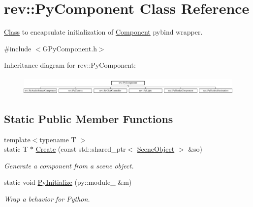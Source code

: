 \hypertarget{classrev_1_1_py_component}{}\section{rev\+::Py\+Component Class Reference}
\label{classrev_1_1_py_component}


\mbox{\hyperlink{struct_class}{Class}} to encapsulate initialization of \mbox{\hyperlink{classrev_1_1_component}{Component}} pybind wrapper.  




{\ttfamily \#include $<$G\+Py\+Component.\+h$>$}

Inheritance diagram for rev\+::Py\+Component\+:\begin{figure}[H]
\begin{center}
\leavevmode
\includegraphics[height=0.947547cm]{classrev_1_1_py_component}
\end{center}
\end{figure}
\subsection*{Static Public Member Functions}
\begin{DoxyCompactItemize}
\item 
\mbox{\label{classrev_1_1_py_component_a8caeb94993368a476f1176892c1e8c1f}} 
{\footnotesize template$<$typename T $>$ }\\static T $\ast$ \mbox{\hyperlink{classrev_1_1_py_component_a8caeb94993368a476f1176892c1e8c1f}{Create}} (const std\+::shared\+\_\+ptr$<$ \mbox{\hyperlink{classrev_1_1_scene_object}{Scene\+Object}} $>$ \&so)
\begin{DoxyCompactList}\small\item\em Generate a component from a scene object. \end{DoxyCompactList}\item 
\mbox{\label{classrev_1_1_py_component_a1e84e8c52a34af82682424f5131cc16b}} 
static void \mbox{\hyperlink{classrev_1_1_py_component_a1e84e8c52a34af82682424f5131cc16b}{Py\+Initialize}} (py\+::module\+\_\+ \&m)
\begin{DoxyCompactList}\small\item\em Wrap a behavior for Python. \end{DoxyCompactList}\end{DoxyCompactItemize}


